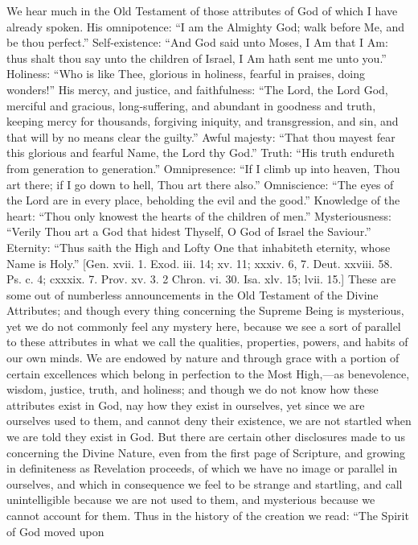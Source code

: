 We hear much in the Old Testament of those attributes of God of
which I have already spoken. His omnipotence: ``I am the Almighty
God; walk before Me, and be thou perfect.'' Self-existence:
``And God said unto Moses, I Am that I Am: thus shalt thou say
unto the children of Israel, I Am hath sent me unto you.''
Holiness: ``Who is like Thee, glorious in holiness, fearful in
praises, doing wonders!'' His mercy, and justice, and
faithfulness: ``The Lord, the Lord God, merciful and gracious,
long-suffering, and abundant in goodness and truth, keeping mercy for
thousands, forgiving iniquity, and transgression, and sin, and that
will by no means clear the guilty.'' Awful majesty: ``That
thou mayest fear this glorious and fearful Name, the Lord thy
God.'' Truth: ``His truth endureth from generation to
generation.'' Omnipresence: ``If I climb up into heaven, Thou
art there; if I go down to hell, Thou art there also.''
Omniscience: ``The eyes of the Lord are in every place, beholding
the evil and the good.'' Knowledge of the heart: ``Thou only
knowest the hearts of the children of men.'' Mysteriousness:
``Verily Thou art a God that hidest Thyself, O God of Israel the
Saviour.'' Eternity: ``Thus saith the High and Lofty One that
inhabiteth eternity, whose Name is Holy.'' [Gen. xvii. 1. Exod.
iii. 14; xv. 11; xxxiv. 6, 7. Deut. xxviii. 58. Ps. c. 4; cxxxix. 7.
Prov. xv. 3. 2 Chron. vi. 30. Isa. xlv. 15; lvii. 15.] These are some
out of numberless announcements in the Old Testament of the Divine
Attributes; and though every thing concerning the Supreme Being is
mysterious, yet we do not commonly feel any mystery here, because we
see a sort of parallel to these attributes in what we call the
qualities, properties, powers, and habits of our own minds. We are
endowed by nature and through grace with a portion of certain
excellences which belong in perfection to the Most High,—as
benevolence, wisdom, justice, truth, and holiness; and though we do
not know how these attributes exist in God, nay how they exist in
ourselves, yet since we are ourselves used to them, and cannot deny
their existence, we are not startled when we are told they exist in
God. But there are certain other disclosures made to us concerning the
Divine Nature, even from the first page of Scripture, and growing in
definiteness as Revelation proceeds, of which we have no image or
parallel in ourselves, and which in consequence we feel to be strange
and startling, and call unintelligible because we are not used to
them, and mysterious because we cannot account for them. Thus in the
history of the creation we read: ``The Spirit of God moved upon
